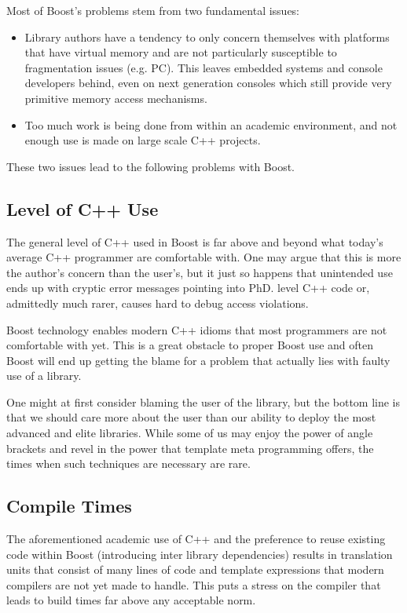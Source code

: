 \documentclass[twocolumn]{paper}
\begin{document}
Most of Boost's problems stem from two fundamental issues:
\begin{itemize}
    \item Library authors have a tendency to only concern themselves with platforms that
    have virtual memory and are not particularly susceptible to
    fragmentation issues (e.g. PC). This leaves embedded systems and console
    developers behind, even on next generation consoles which still
    provide very primitive memory access mechanisms.
    \item Too much work is being done from within an academic environment, and
    not enough use is made on large scale C++ projects.
\end{itemize}

These two issues lead to the following problems with Boost.

\subsection{Level of C++ Use}

The general level of C++ used in Boost is far above and beyond what
today's average C++ programmer are comfortable with. One may argue
that this is more the author's concern than the user's, but it just
so happens that unintended use ends up with cryptic error messages
pointing into PhD. level C++ code or, admittedly much rarer, causes
hard to debug access violations.

Boost technology enables modern C++ idioms that most programmers are
not comfortable with yet. This is a great obstacle to proper Boost
use and often Boost will end up getting the blame for a problem that
actually lies with faulty use of a library.

One might at first consider blaming the user of the library, but the
bottom line is that we should care more about the user than our
ability to deploy the most advanced and elite libraries. While some
of us may enjoy the power of angle brackets and revel in the power
that template meta programming offers, the times when such
techniques are necessary are rare.

\subsection{Compile Times}

The aforementioned academic use of C++ and the preference to reuse
existing code within Boost (introducing inter library dependencies)
results in translation units that consist of many lines of code and
template expressions that modern compilers are not yet made to
handle. This puts a stress on the compiler that leads to build times
far above any acceptable norm.
\end{document}
